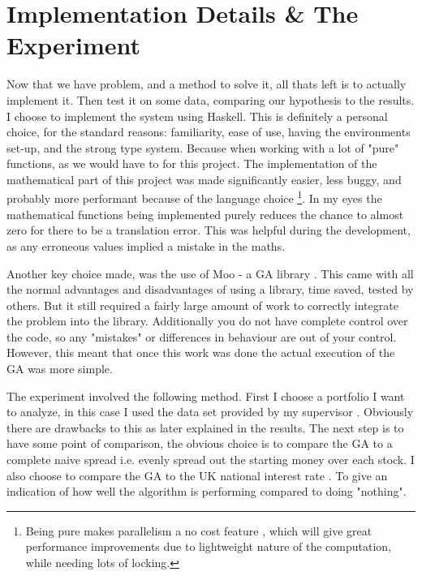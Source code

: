 \documentclass[11pt]{article}
\begin{document}
\section{Implementation Details \& The Experiment}

    Now that we have problem, and a method to solve it, all thats left is to actually
    implement it. Then test it on some data, comparing our hypothesis to the results.
    I choose to implement the system using Haskell. This is definitely a personal
    choice, for the standard reasons: familiarity, ease of use, having the environments
    set-up, and the strong type system. Because when working with a lot of "pure"
    functions, as we would have to for this project. The implementation 
    of the mathematical part of this project was made significantly
    easier, less buggy, and probably more performant because of the language choice
    \footnote{Being pure makes parallelism a no cost feature \cite{HarrisMarlowJones, Chakravarty},
    which will give great performance improvements due to lightweight nature of the 
    computation, while needing lots of locking. }.
    In my eyes the mathematical functions
    being implemented purely reduces the chance to almost zero for there to be a translation
    error. This was helpful during the development, as any erroneous values implied a mistake
    in the maths.

    Another key choice made, was the use of Moo - a GA library \cite{Moo}. This came with all
    the normal advantages and disadvantages of using a library, time saved, tested by others.
    But it still required a fairly large amount of work to correctly integrate the
    problem into the library. Additionally you do not have complete control over the code,
    so any "mistakes" or differences in behaviour are out of your control. However,
    this meant that once this work was done the actual execution of the GA was more simple.

    The experiment involved the following method. First I choose a portfolio I want to
    analyze, in this case I used the data set provided by my supervisor \cite{Dataset}.
    Obviously there are drawbacks to this as later explained in the results. The next step is
    to have some point of comparison, the obvious choice is to compare the GA to
    a complete naive spread i.e. evenly spread out the starting money over each stock.
    I also choose to compare the GA to the UK national interest rate \cite{BankOfE} . To give an
    indication of how well the algorithm is performing compared to doing "nothing".
\end{document}
